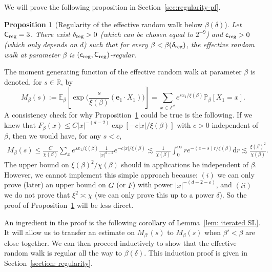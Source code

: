 \documentclass[11pt,a4paper]{article}
\numberwithin{equation}{section}
\theoremstyle{plain}
\newtheorem{Prop}[Thm]{Proposition}
\theoremstyle{definition}
\newcommand\1{\mathds{1}}
\newcommand\creg{\mathsf{c}_{\textup{reg}}}
\newcommand\Creg{\mathsf{C}_{\textup{reg}}}
\newcommand{\deltareg}{\delta_{\textup{reg}}}
\begin{document}
We will prove the following proposition in Section~\ref{sec:regularity-pf}.


\begin{Prop}[Regularity of the effective random walk below $\beta(\delta)$]
\label{prop: regularity below beta(delta)}
Let $\Creg =3$. There exist $\deltareg>0$ (which can be chosen equal to $2^{-9}$) and $\creg>0$ (which only depends on $d$) such that for every $\beta< \beta(\deltareg)$, the effective random walk at parameter $\beta$ is $(\creg,\Creg)$-regular.
\end{Prop}



The moment generating function
of the effective random walk
at parameter $\beta$ is denoted, for $s\in \mathbb R$, by
\begin{equation}
\label{eq:mgfX1}
	M_{\beta} (s)
    :=
    \mathbb E_\beta \left[\exp\Big(\frac{s}{\xi(\beta)}(\mathbf{e}_1 \cdot X_1)\Big)\right]
    =
    \sum_{x\in\mathbb Z^d} e^{sx_1/\xi(\beta)} \mathbb P_\beta[X_1=x].
\end{equation}
A consistency check for why
Proposition~\ref{prop: regularity below beta(delta)} could be true is the following.
If we knew that
$F_\beta(x) \le C |x|^{-(d-2)}\exp[-c |x|/\xi(\beta)]$
with $c>0$ independent of $\beta$, then we would have, for any $s<c$,
\begin{align}
\label{eq:regularity-heuristic}
    M_\beta(s) \le \frac{C}{\chi(\beta)} \sum_x e^{sx_1/\xi(\beta)}
    \frac{1}{|x|^{d-2}}e^{-c |x|/\xi(\beta)}
    \lesssim \frac{1}{\chi(\beta)} \int_0^\infty r e^{-(c-s) r/\xi(\beta)} \mathrm{d} r
    \lesssim \frac{\xi(\beta)^2}{\chi(\beta)}.
\end{align}
The upper bound on $\xi(\beta)^2/\chi(\beta)$ should in applications
 be independent of $\beta$.
However, we cannot implement this simple approach because: $(i)$
we can only prove (later) an upper bound on $G$ (or $F$)
with power $|x|^{-(d-2-\varepsilon)}$, and $(ii)$ we do not prove that
$\xi^2 \asymp \chi$ (we can only prove this up to a power $\delta$).
So the proof of Proposition~\ref{prop: regularity below beta(delta)} will be less direct.

An ingredient in the proof is the following corollary of Lemma~\ref{lem: iterated SL}.
It will allow us to transfer an estimate on $M_{\beta'}(s)$ to $M_\beta(s)$ when $\beta'<\beta$ are close together. We can then proceed inductively to show that the effective random walk is regular all the way to $\beta(\delta)$.  This induction
proof is given in Section~\ref{section: regularity}.
\end{document}
